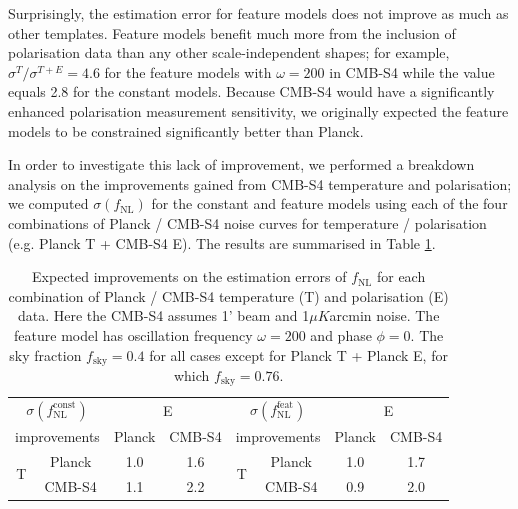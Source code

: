 Surprisingly, the estimation error for feature models does not improve as much as other templates. Feature models benefit much more from the inclusion of polarisation data than any other scale-independent shapes; for example, $\sigma^{T}/\sigma^{T+E} = 4.6$ for the feature models with $\omega=200$ in CMB-S4 while the value equals 2.8 for the constant models. Because CMB-S4 would have a significantly enhanced polarisation measurement sensitivity, we originally expected the feature models to be constrained significantly better than Planck.

In order to investigate this lack of improvement, we performed a breakdown analysis on the improvements gained from CMB-S4 temperature and polarisation; we computed $\sigma(f_\text{NL})$ for the constant and feature models using each of the four combinations of Planck / CMB-S4 noise curves for temperature / polarisation (e.g. Planck T + CMB-S4 E). The results are summarised in Table \ref{forecast mixed}.

\begin{table}[ht]
	\caption{Expected improvements on the estimation errors of $f_\text{NL}$ for each combination of Planck / CMB-S4 temperature (T) and polarisation (E) data. Here the CMB-S4 assumes 1' beam and 1$\mu K$arcmin noise. The feature model has oscillation frequency $\omega=200$ and phase $\phi=0$. The sky fraction $f_\text{sky}=0.4$ for all cases except for Planck T + Planck E, for which $f_\text{sky}=0.76$.}
	\centering
	\label{forecast mixed}
	\renewcommand{\arraystretch}{1.5}
	\begin{tabular}{c c c c c c c c}
		\toprule
		\multicolumn{2}{c}{$\sigma(f_\text{NL}^\text{const})$}  &  \multicolumn{2}{c}{E}  & \multicolumn{2}{c}{$\sigma(f_\text{NL}^\text{feat})$}  &  \multicolumn{2}{c}{E}  \\
		\cmidrule(lr){3-4} \cmidrule(lr){7-8} 
		\multicolumn{2}{c}{improvements}  & Planck & CMB-S4 & \multicolumn{2}{c}{improvements}  & Planck & CMB-S4 \\
		\cmidrule(lr){1-4} \cmidrule(lr){5-8}
		\multirow{2}{*}{T} & Planck & 1.0 & 1.6 & \multirow{2}{*}{T} & Planck & 1.0 & 1.7 \\
		& CMB-S4 & 1.1 & 2.2 & & CMB-S4 & 0.9 & 2.0 \\
		\bottomrule
	\end{tabular}
\end{table}

